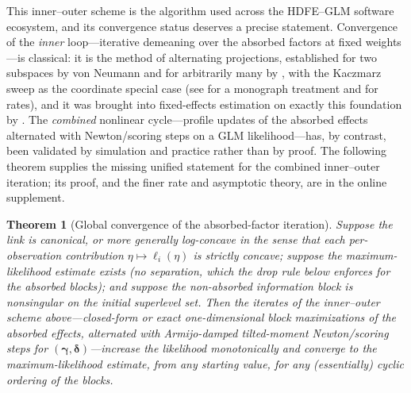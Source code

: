 \documentclass[11pt]{article}
\newtheorem{theorem}{Theorem}
\newcommand{\bgamma}{\bm{\gamma}}
\newcommand{\bdelta}{\bm{\delta}}
\begin{document}
This inner--outer scheme is the algorithm used across the HDFE--GLM
software ecosystem, and its convergence status deserves a precise
statement.  Convergence of the \emph{inner} loop---iterative demeaning
over the absorbed factors at fixed weights---is classical: it is the
method of alternating projections, established for two subspaces by von
Neumann \citeyearpar{vonneumann1950} and for arbitrarily many by
\citet{halperin1962}, with the Kaczmarz sweep \citep{kaczmarz1937} as
the coordinate special case (see \citealp{escalante2011} for a
monograph treatment and \citealp{deutschhundal1997} for rates), and it
was brought into fixed-effects estimation on exactly this foundation by
\citet{gaure2013}.  The \emph{combined} nonlinear cycle---profile
updates of the absorbed effects alternated with Newton/scoring steps on
a GLM likelihood---has, by contrast, been validated by simulation and
practice \citep{guimaraes2010,berge2018,correia2020} rather than by
proof.  The following theorem supplies the missing unified statement
for the combined inner--outer iteration; its proof, and the finer rate
and asymptotic theory, are in the online supplement.

\begin{theorem}[Global convergence of the absorbed-factor iteration]
\label{thm:global-main}
Suppose the link is canonical, or more generally log-concave in the sense
that each per-observation contribution $\eta \mapsto \ell_i(\eta)$ is
strictly concave; suppose the maximum-likelihood estimate exists (no
separation, which the drop rule below enforces for the absorbed blocks);
and suppose the non-absorbed information block is nonsingular on the
initial superlevel set.  Then the iterates of the inner--outer scheme
above---closed-form or exact one-dimensional block maximizations of the
absorbed effects, alternated with Armijo-damped tilted-moment
Newton/scoring steps for $(\bgamma,\bdelta)$---increase the likelihood
monotonically and converge to the maximum-likelihood estimate, from any
starting value, for any (essentially) cyclic ordering of the blocks.
\end{theorem}
\end{document}

